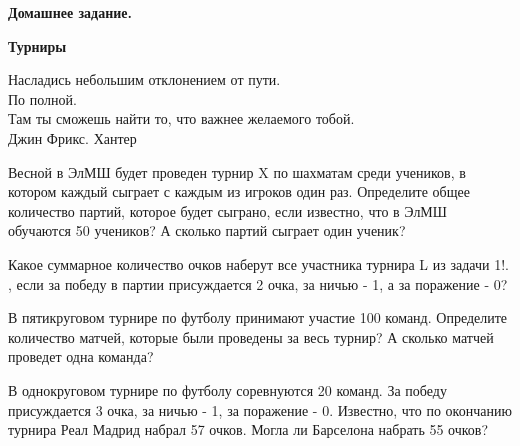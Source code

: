 \hspace{3mm}

\centerline{\bf \Huge Домашнее задание.}
\centerline{\bf \Huge Турниры}

\begin{flushright}
    \scriptsize{Насладись небольшим отклонением от пути.\\ По полной.\\ Там ты сможешь найти то, что важнее желаемого тобой. \\Джин Фрикс. Хантер}
\end{flushright}

 Весной в ЭлМШ будет проведен турнир X по шахматам среди учеников, в котором каждый сыграет с каждым из игроков один раз. Определите общее количество партий, которое будет сыграно, если известно, что в ЭлМШ обучаются 50 учеников? А сколько партий сыграет один ученик?

 Какое суммарное количество очков наберут все участника турнира L из задачи 1!. , если за победу в партии присуждается 2 очка, за ничью - 1, а за поражение - 0?

 В пятикруговом турнире по футболу принимают участие 100 команд. Определите количество матчей, которые были проведены за весь турнир? А сколько матчей проведет одна команда?

 В однокруговом турнире по футболу соревнуются 20 команд. За победу присуждается 3 очка, за ничью - 1, за поражение - 0. Известно, что по окончанию турнира Реал Мадрид набрал 57 очков. Могла ли Барселона набрать 55 очков?
